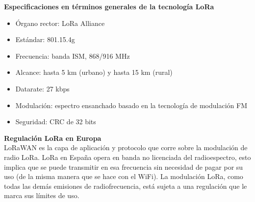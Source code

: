 \documentclass[12pt]{article}
\begin{document}
	\noindent \textbf{Especificaciones en términos generales de la tecnología LoRa}
	
	\begin{itemize}
		\item Órgano rector: LoRa Alliance
		\item Estándar: 801.15.4g
		\item Frecuencia: banda ISM, 868/916 MHz
		\item Alcance: hasta 5 km (urbano) y hasta 15 km (rural)
		\item Datarate: 27 kbps
		\item Modulación: espectro ensanchado basado en la tecnología de modulación FM
		\item Seguridad: CRC de 32 bits
	\end{itemize}
	 
	 
	
	\noindent  \textbf{Regulación LoRa en Europa} \\
	
	\noindent LoRaWAN es la capa de aplicación y protocolo que corre sobre la modulación de radio LoRa. LoRa en España opera en banda no licenciada del radioespectro, esto implica que se puede transmitir en esa frecuencia sin necesidad de pagar por su uso (de la misma manera que se hace con el WiFi). La modulación LoRa, como todas las demás emisiones de radiofrecuencia, está sujeta a una regulación que le marca sus límites de uso. \\
	
\end{document}
